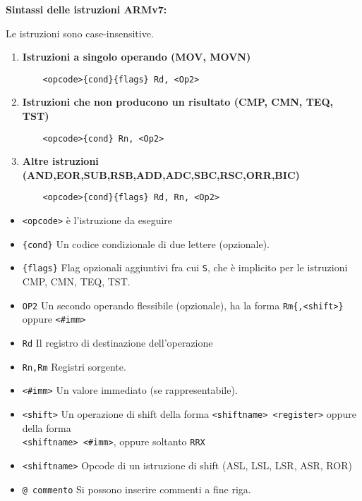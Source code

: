 \begin{defn}
\textbf{Sintassi delle istruzioni ARMv7:}

\begin{note}
	Le istruzioni sono case-insensitive.
\end{note}

\begin{enumerate}
	\item \textbf{Istruzioni a singolo operando (MOV, MOVN)}
	\begin{Verbatim}
	<opcode>{cond}{flags} Rd, <Op2>
	\end{Verbatim}

	\item \textbf{Istruzioni che non producono un risultato (CMP, CMN, TEQ, TST)}
	\begin{Verbatim}
	<opcode>{cond} Rn, <Op2>
	\end{Verbatim}

	\item \textbf{Altre istruzioni (AND,EOR,SUB,RSB,ADD,ADC,SBC,RSC,ORR,BIC)}
	\begin{Verbatim}
	<opcode>{cond}{flags} Rd, Rn, <Op2>
	\end{Verbatim}
\end{enumerate}


\begin{itemize}
	\item \verb|<opcode>| è l'istruzione da eseguire
	\item \verb|{cond}| Un codice condizionale di due lettere (opzionale).
	\item \verb|{flags}| Flag opzionali aggiuntivi fra cui \verb|S|, che è implicito per le istruzioni CMP, CMN, TEQ, TST.
	\item \verb|OP2| Un secondo operando flessibile (opzionale), ha la forma \verb|Rm{,<shift>}| oppure \verb|<#imm>|
	\item \verb|Rd| Il registro di destinazione dell'operazione
	\item \verb|Rn,Rm| Registri sorgente.
	\item \verb|<#imm>| Un valore immediato (se rappresentabile).
	\item \verb|<shift>| Un operazione di shift della forma \verb|<shiftname> <register>| oppure della forma \\
	 \verb|<shiftname> <#imm>|, oppure soltanto \verb|RRX|
	\item \verb|<shiftname>| Opcode di un istruzione di shift (ASL, LSL, LSR, ASR, ROR)
	\item \verb|@ commento| Si possono inserire commenti a fine riga.
\end{itemize}
\end{defn}

